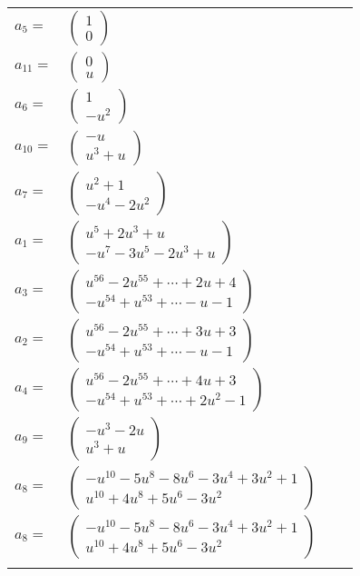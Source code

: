 \documentclass[1p]{elsarticle_modified}
\theoremstyle{definition}
\begin{document}
\begin{tabular}{m{7pt} m{180pt} m{7pt} m{180pt} }
\flushright $a_{5}=$&$\begin{pmatrix}1\\0\end{pmatrix}$ \\
\flushright $a_{11}=$&$\begin{pmatrix}0\\u\end{pmatrix}$ \\
\flushright $a_{6}=$&$\begin{pmatrix}1\\- u^2\end{pmatrix}$ \\
\flushright $a_{10}=$&$\begin{pmatrix}- u\\u^3+u\end{pmatrix}$ \\
\flushright $a_{7}=$&$\begin{pmatrix}u^2+1\\- u^4-2 u^2\end{pmatrix}$ \\
\flushright $a_{1}=$&$\begin{pmatrix}u^5+2 u^3+u\\- u^7-3 u^5-2 u^3+u\end{pmatrix}$ \\
\flushright $a_{3}=$&$\begin{pmatrix}u^{56}-2 u^{55}+\cdots+2 u+4\\- u^{54}+u^{53}+\cdots- u-1\end{pmatrix}$ \\
\flushright $a_{2}=$&$\begin{pmatrix}u^{56}-2 u^{55}+\cdots+3 u+3\\- u^{54}+u^{53}+\cdots- u-1\end{pmatrix}$ \\
\flushright $a_{4}=$&$\begin{pmatrix}u^{56}-2 u^{55}+\cdots+4 u+3\\- u^{54}+u^{53}+\cdots+2 u^2-1\end{pmatrix}$ \\
\flushright $a_{9}=$&$\begin{pmatrix}- u^3-2 u\\u^3+u\end{pmatrix}$ \\
\flushright $a_{8}=$&$\begin{pmatrix}- u^{10}-5 u^8-8 u^6-3 u^4+3 u^2+1\\u^{10}+4 u^8+5 u^6-3 u^2\end{pmatrix}$\\ \flushright $a_{8}=$&$\begin{pmatrix}- u^{10}-5 u^8-8 u^6-3 u^4+3 u^2+1\\u^{10}+4 u^8+5 u^6-3 u^2\end{pmatrix}$\\&\end{tabular}
\end{document}
